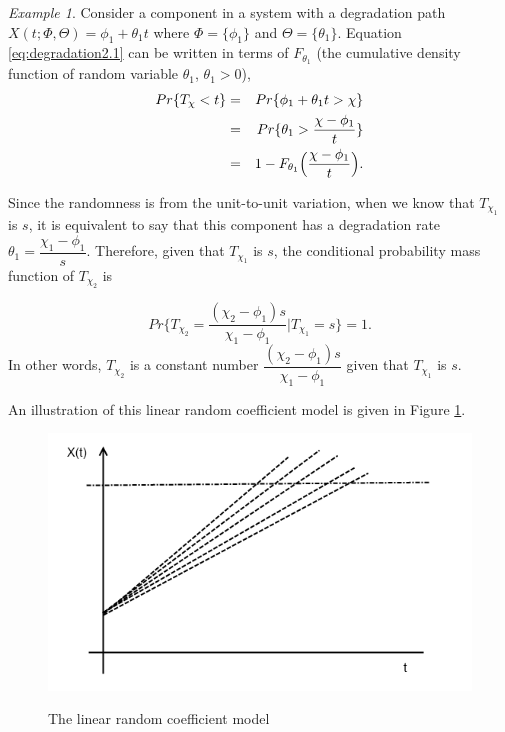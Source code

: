\documentclass[10pt,a4paper]{article}
\theoremstyle{remark}
\newtheorem{example}{Example}
\begin{document}
\begin{example} \label{ex:degradation1} \renewcommand{\qedsymbol}{$\lozenge$} \mbox{} 
Consider a component in a system with a degradation path $X(t;\Phi,\Theta)=\phi_{1}+\theta_{1}t$ where $\Phi=\{\phi_{1}\}$ and $\Theta=\{\theta_{1}\}$. Equation \ref{eq:degradation2.1} can be written in terms of $F_{\theta_{1}}$ (the cumulative density function of random variable $\theta_{1}$, $\theta_{1} > 0$),
\begin{eqnarray} 
Pr\{T_{\chi} <t\}  & = & Pr\{\phi_{1}+\theta_{1}t > \chi \} \notag\\
 & = &  Pr\{\theta_{1} > \frac{\chi-\phi_{1}}{t} \} \notag\\
& = & 1- F_{\theta_{1}}\Big( \frac{\chi-\phi_{1}}{t}\Big). \notag\\
\end{eqnarray}

Since the randomness is from the unit-to-unit variation, when we know that $T_{\chi_{1}}$ is $s$, it is equivalent to say that this component has a degradation rate $\theta_{1}=\dfrac{\chi_{1}-\phi_{1}}{s}$. Therefore, given that $T_{\chi_{1}}$ is $s$, the conditional probability mass function of $T_{\chi_{2}}$ is

\begin{equation*}
Pr\{T_{\chi_{2}}=\dfrac{(\chi_2-\phi_1)s}{\chi_1-\phi_1} | T_{\chi_{1}}=s \} =1.
\end{equation*} 
In other words, $T_{\chi_2}$ is a constant number $\dfrac{(\chi_2-\phi_1)s}{\chi_1-\phi_1}$ given that $T_{\chi_1}$ is $s$.

An illustration of this linear random coefficient model is given in Figure \ref{pic:example3}.
\begin{figure}[h!!!]  %
  \centering
  \includegraphics[width=6in]{example3.png}\\
  \footnotesize
  \caption{ \footnotesize{The linear random coefficient model} }\label{pic:example3}
\end{figure}


\end{example}
\end{document}

